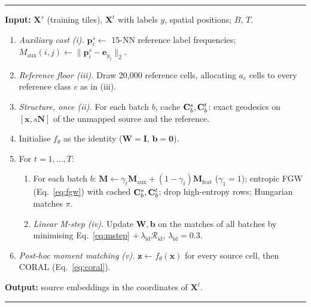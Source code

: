 \begin{algorithm}[t]
\caption{\frost. Steps refer to Section~\ref{sec:frost}; the reference $\mathbf{X}^{t}$ is never modified.}
\label{alg:frost}
\hrule\smallskip
\noindent\textbf{Input:} $\mathbf{X}^{s}$ (training tiles), $\mathbf{X}^{t}$ with labels $y$, spatial positions; $B$, $T$.
\begin{enumerate}\setlength{\itemsep}{1pt}
\item \emph{Auxiliary cost (i).} $\mathbf{p}^{s}_{i}\leftarrow$ 15-NN reference label frequencies;
  $M_{\mathrm{aux}}(i,j)\leftarrow\|\mathbf{p}^{s}_{i}-\mathbf{e}_{y_j}\|_2$.
\item \emph{Reference floor (iii).} Draw 20{,}000 reference cells, allocating $a_c$ cells to every reference class
  $c$ as in (iii).
\item \emph{Structure, once (ii).} For each batch $b$, cache $\mathbf{C}^{s}_b,\mathbf{C}^{t}_b$: exact geodesics on
  $[\mathbf{x},s\mathbf{N}]$ of the unmapped source and the reference.
\item Initialise $f_\theta$ as the identity ($\mathbf{W}=\mathbf{I}$, $\mathbf{b}=\mathbf{0}$).
\item For $t=1,\dots,T$:
  \begin{enumerate}\setlength{\itemsep}{1pt}
  \item For each batch $b$: $\mathbf{M}\leftarrow\gamma_t\mathbf{M}_{\mathrm{aux}}+(1-\gamma_t)\mathbf{M}_{\mathrm{feat}}$
    ($\gamma_1=1$); entropic FGW (Eq.~\ref{eq:fgw}) with cached $\mathbf{C}^{s}_b,\mathbf{C}^{t}_b$; drop high-entropy rows;
    Hungarian matches $\pi$.
  \item \emph{Linear M-step (iv).} Update $\mathbf{W},\mathbf{b}$ on the matches of all batches by minimising
    Eq.~\eqref{eq:mstep} $+\,\lambda_{\mathrm{id}}\mathcal{R}_{\mathrm{id}}$, $\lambda_{\mathrm{id}}=0.3$.
  \end{enumerate}
\item \emph{Post-hoc moment matching (v).} $\mathbf{z}\leftarrow f_\theta(\mathbf{x})$ for every source cell, then CORAL
  (Eq.~\ref{eq:coral}).
\end{enumerate}
\noindent\textbf{Output:} source embeddings in the coordinates of $\mathbf{X}^{t}$.
\smallskip\hrule
\end{algorithm}
